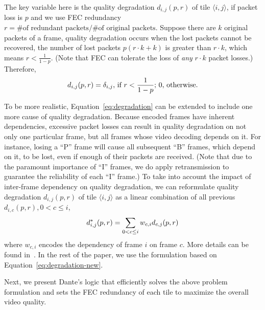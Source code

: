 The key variable here is the quality degradation $d_{i,j}(p,r)$
of tile $\langle i,j\rangle$, if packet loss is $p$ and we use
FEC redundancy $r=\textrm{\# of redundant packets}/\textrm{\# of original packets}$. 
Suppose there are $k$ original packets of a frame, quality
degradation occurs when the lost packets cannot be recovered, 
\ie the number of lost packets $p(r\cdot k+k)$ is greater than
$r\cdot k$, which means $r<\frac{1}{1-p}$. (Note that FEC can
tolerate the loss of {\em any} $r\cdot k$ packet losses.) Therefore, 
\vspace{-0.25cm}
\begin{equation}
d_{i,j}(p,r) = \delta_{i,j}\textrm{, if }r<\frac{1}{1-p}\textrm{; }0\textrm{, otherwise.}\label{eq:degradation}
\vspace{-0.25cm}
\end{equation}

To be more realistic, Equation~\ref{eq:degradation} can be extended
to include one more cause
of quality degradation. Because encoded frames have inherent
dependencies, excessive packet losses can result in quality
degradation on not only one particular frame, but all frames 
whose video decoding depends on it. For instance, losing a ``P'' frame 
will cause all subsequent ``B'' frames, which depend on it, to be lost, even if enough 
of their packets are received. (Note that due to the paramount 
importance of ``I'' frames, we do apply retransmission to 
guarantee the reliability of each ``I'' frame.) To take into 
account the impact of inter-frame dependency on quality 
degradation, we can reformulate quality degradation 
$d_{i,j}(p,r)$ of tile $\langle i,j\rangle$ as a linear 
combination of all previous $d_{i,c}(p,r),0<c\leq i$, \ie
\vspace{-0.25cm}
\begin{equation}
d_{i,j}^{*}(p,r) = \sum_{0<c\leq i}w_{c,i}d_{c,j}(p,r) \label{eq:degradation-new}
\vspace{-0.25cm}
\end{equation}
where $w_{c,i}$ encodes the dependency of frame $i$ on frame $c$. 
More details can be found in~\cite{distortion_model}. 
In the rest of the paper, we use the formulation based on 
Equation~\ref{eq:degradation-new}.




\label{subsec:logic}


Next, we present Dante's logic that efficiently solves the above 
problem formulation and sets the FEC redundancy of each tile to 
maximize the overall video quality. 

